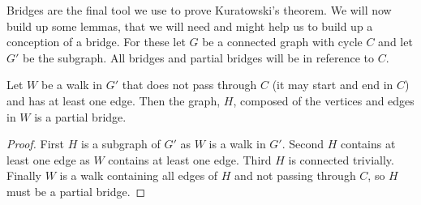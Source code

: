 \documentclass{article}
\begin{document}
Bridges are the final tool we use to prove Kuratowski's theorem. We will now build up some lemmas, that we will need and might help us to build up a conception of a bridge. For these let $G$ be a connected graph with cycle $C$ and let $G'$ be the subgraph. All bridges and partial bridges will be in reference to $C$.


\begin{lemma}\label{walktopartialbridge}
	Let $W$ be a walk in $G'$ that does not pass through $C$ (it may start and end in $C$) and has at least one edge. Then the graph, $H$, composed of the vertices and edges in $W$ is a partial bridge.
\end{lemma}
\begin{proof}
	First $H$ is a subgraph of $G'$ as $W$ is a walk in $G'$. Second $H$ contains at least one edge as $W$ contains at least one edge. Third $H$ is connected trivially. Finally $W$ is a walk containing all edges of $H$ and not passing through $C$, so $H$ must be a partial bridge.
\end{proof}
\end{document}
